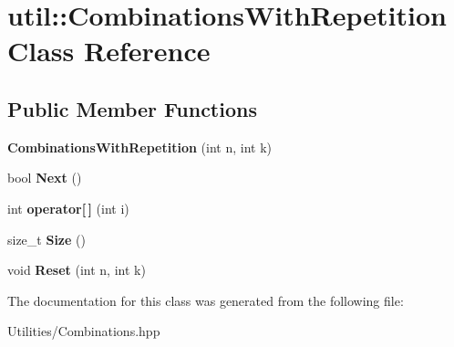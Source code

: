 \hypertarget{classutil_1_1_combinations_with_repetition}{\section{util\+:\+:Combinations\+With\+Repetition Class Reference}
\label{classutil_1_1_combinations_with_repetition}
}
\subsection*{Public Member Functions}
\begin{DoxyCompactItemize}
\item 
\hypertarget{classutil_1_1_combinations_with_repetition_a44438fef8dda93a2c3a4b8a5000e9739}{{\bfseries Combinations\+With\+Repetition} (int n, int k)}\label{classutil_1_1_combinations_with_repetition_a44438fef8dda93a2c3a4b8a5000e9739}

\item 
\hypertarget{classutil_1_1_combinations_with_repetition_a33e969d39233173d932830e9a6c9f3c6}{bool {\bfseries Next} ()}\label{classutil_1_1_combinations_with_repetition_a33e969d39233173d932830e9a6c9f3c6}

\item 
\hypertarget{classutil_1_1_combinations_with_repetition_aecc5aae1a212d6abcc8977dd28750658}{int {\bfseries operator\mbox{[}$\,$\mbox{]}} (int i)}\label{classutil_1_1_combinations_with_repetition_aecc5aae1a212d6abcc8977dd28750658}

\item 
\hypertarget{classutil_1_1_combinations_with_repetition_ac9130257a2934ab29b89b385b111b8e6}{size\+\_\+t {\bfseries Size} ()}\label{classutil_1_1_combinations_with_repetition_ac9130257a2934ab29b89b385b111b8e6}

\item 
\hypertarget{classutil_1_1_combinations_with_repetition_a5caec7287a7af4a51280b36397d78afa}{void {\bfseries Reset} (int n, int k)}\label{classutil_1_1_combinations_with_repetition_a5caec7287a7af4a51280b36397d78afa}

\end{DoxyCompactItemize}


The documentation for this class was generated from the following file\+:\begin{DoxyCompactItemize}
\item 
Utilities/Combinations.\+hpp\end{DoxyCompactItemize}
